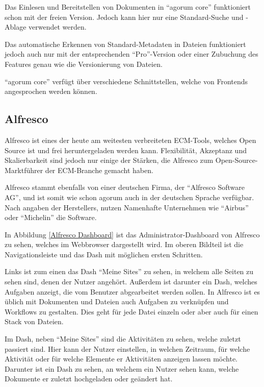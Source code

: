 Das Einlesen und Bereitstellen von Dokumenten in "`agorum core"' funktioniert schon mit der freien Version. Jedoch kann hier nur eine Standard-Suche und -Ablage verwendet werden. \cite{agorum_preise}

Das automatische Erkennen von Standard-Metadaten in Dateien funktioniert jedoch auch nur mit der entsprechenden "`Pro"'-Version oder einer Zubuchung des Features genau wie die Versionierung von Dateien.

"`agorum core"' verf\"ugt \"uber verschiedene Schnittstellen, welche von Frontends angesprochen werden k\"onnen. 

\subsection{Alfresco} \label{Alfresco}
Alfresco ist eines der heute am weitesten verbreiteten \ac{ECM}-Tools, welches Open Source ist und frei heruntergeladen werden kann.
Flexibilit\"at, Akzeptanz und Skalierbarkeit sind jedoch nur einige der St\"arken, die Alfresco zum Open-Source-Marktf\"uhrer der \ac{ECM}-Branche gemacht haben. \cite{Alfresco_und_Liferay} \cite{Wiki_Alfresco} \cite{Alfresco_Implementation}

Alfresco stammt ebenfalls von einer deutschen Firma, der "`Alfresco Software AG"', und ist somit wie schon agorum auch in der deutschen Sprache verf\"ugbar. Nach angaben der Herstellers, nutzen Namenhafte Unternehmen wie "`Airbus"' oder "`Michelin"' die Software. \cite{Alfresco_Website}

In Abbildung \ref{Alfresco Dashboard} ist das Administrator-Dashboard von Alfresco zu sehen, welches im Webbrowser dargestellt wird.
Im oberen Bildteil ist die Navigationsleiste und das Dash mit m\"oglichen ersten Schritten.

Links ist zum einen das Dash "`Meine Sites"' zu sehen, in welchem alle Seiten zu sehen sind, denen der Nutzer angeh\"ort. Au\ss{}erdem ist darunter ein Dash, welches Aufgaben anzeigt, die vom Benutzer abgearbeitet werden sollen. In Alfresco ist es \"ublich mit Dokumenten und Dateien auch Aufgaben zu verkn\"upfen und Workflows zu gestalten. Dies geht f\"ur jede Datei einzeln oder aber auch f\"ur einen Stack von Dateien.

Im Dash, neben "`Meine Sites"' sind die Aktivit\"aten zu sehen, welche zuletzt passiert sind. Hier kann der Nutzer einstellen, in welchen Zeitraum, f\"ur welche Aktivit\"at oder f\"ur welche Elemente er Aktivit\"aten anzeigen lassen m\"ochte.
Darunter ist ein Dash zu sehen, an welchem ein Nutzer sehen kann, welche Dokumente er zuletzt hochgeladen oder ge\"andert hat.

